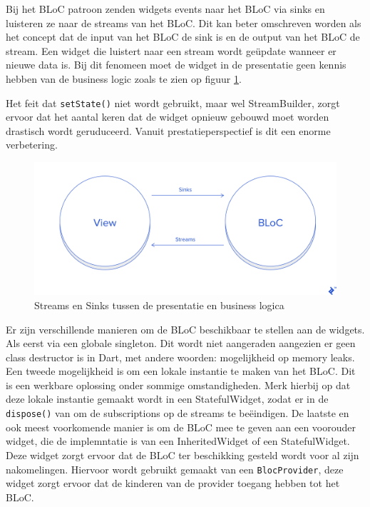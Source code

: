 Bij het BLoC patroon zenden widgets events naar het BLoC via sinks en luisteren ze naar de streams van het BLoC.
Dit kan beter omschreven worden als het concept dat de input van het BLoC de sink is en de output van het BLoC de stream. Een widget die luistert naar een stream wordt geüpdate wanneer er nieuwe data is. Bij dit fenomeen moet de widget in de presentatie geen kennis hebben van de business logic zoals te zien op figuur \ref{fig:bloc-pattern-streams-sinks}. 

Het feit dat \verb|setState()| niet wordt gebruikt, maar wel StreamBuilder, zorgt ervoor dat het aantal keren dat de widget opnieuw gebouwd moet worden drastisch wordt geruduceerd.
Vanuit prestatieperspectief is dit een enorme verbetering.

\begin{figure}[H]
    \centering
    \includegraphics[width=\figureWidthModifier\linewidth]{img/stand-van-zaken/bloc-pattern-streams-sinks.png}
    \caption{Streams en Sinks tussen de presentatie en business logica \autocite{Perutovic2018}}
    \label{fig:bloc-pattern-streams-sinks}
\end{figure}

Er zijn verschillende manieren om de BLoC beschikbaar te stellen aan de widgets. Als eerst via een globale singleton. Dit wordt niet aangeraden aangezien er geen class destructor is in Dart, met andere woorden: mogelijkheid op memory leaks.
Een tweede mogelijkheid is om een lokale instantie te maken van het BLoC. Dit is een werkbare oplossing onder sommige omstandigheden. Merk hierbij op dat deze lokale instantie gemaakt wordt in een StatefulWidget, zodat er in de \verb|dispose()| van om de subscriptions op de streams te beëindigen.
De laatste en ook meest voorkomende manier is om de BLoC mee te geven aan een voorouder widget, die de implemntatie is van een InheritedWidget of een StatefulWidget.  Deze widget zorgt ervoor dat de BLoC ter beschikking gesteld wordt voor al zijn nakomelingen. Hiervoor wordt gebruikt gemaakt van een \verb|BlocProvider|, deze widget zorgt ervoor dat de kinderen van de provider toegang hebben tot het BLoC.

